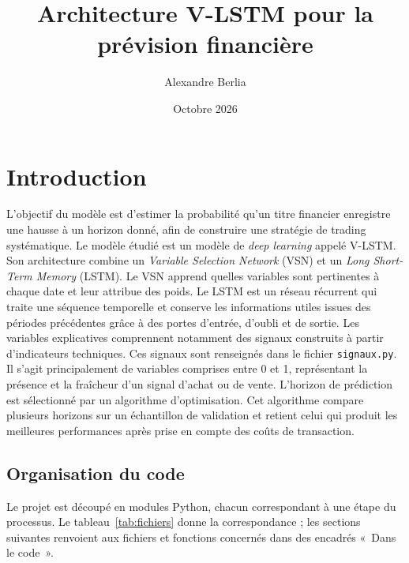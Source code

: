 \documentclass[11pt,a4paper]{article}
\title{Architecture V-LSTM pour la prévision financière}
\author{Alexandre Berlia}
\date{Octobre 2026}
\renewcommand{\_}{\usorig\allowbreak}   %
\newcommand{\f}[1]{\texttt{#1}}        %
\begin{document}
\maketitle
\tableofcontents
\bigskip

\section{Introduction}
L'objectif du modèle est d'estimer la probabilité qu'un titre financier enregistre une
hausse à un horizon donné, afin de construire une stratégie de trading systématique.
Le modèle étudié est un modèle de \emph{deep learning} appelé V-LSTM. Son architecture
combine un \emph{Variable Selection Network} (VSN) et un \emph{Long Short-Term Memory} (LSTM).
Le VSN apprend quelles variables sont pertinentes à chaque date et leur attribue des
poids. Le LSTM est un réseau récurrent qui traite une séquence temporelle et conserve
les informations utiles issues des périodes précédentes grâce à des portes d'entrée,
d'oubli et de sortie. Les variables explicatives comprennent notamment des signaux
construits à partir d'indicateurs techniques. Ces signaux sont renseignés dans le fichier
\f{signaux.py}. Il s'agit principalement de variables comprises entre 0 et 1, représentant
la présence et la fraîcheur d'un signal d'achat ou de vente. L'horizon de prédiction est
sélectionné par un algorithme d'optimisation. Cet algorithme compare plusieurs horizons
sur un échantillon de validation et retient celui qui produit les meilleures performances
après prise en compte des coûts de transaction.

\subsection{Organisation du code}
Le projet est découpé en modules Python, chacun correspondant à une étape du processus.
Le tableau~\ref{tab:fichiers} donne la correspondance ; les sections suivantes renvoient
aux fichiers et fonctions concernés dans des encadrés «~Dans le code~».
\end{document}
